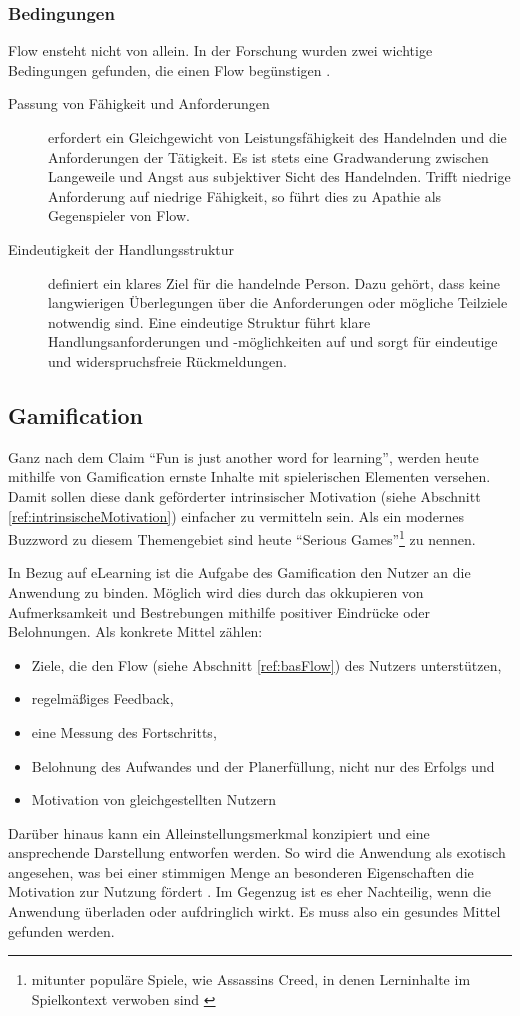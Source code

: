 \subsubsection{Bedingungen}
Flow ensteht nicht von allein. In der Forschung wurden zwei wichtige Bedingungen
gefunden, die einen Flow begünstigen \cite{csikszentmihalyi:1993}.
\begin{description}
\item[Passung von Fähigkeit und Anforderungen] erfordert ein Gleichgewicht von
Leistungsfähigkeit des Handelnden und die Anforderungen der Tätigkeit. Es ist
stets eine Gradwanderung zwischen Langeweile und Angst aus subjektiver Sicht
des Handelnden. Trifft niedrige Anforderung auf niedrige Fähigkeit, so führt
dies zu Apathie als Gegenspieler von Flow.
\item[Eindeutigkeit der Handlungsstruktur] definiert ein klares Ziel für die
handelnde Person. Dazu gehört, dass keine langwierigen Überlegungen über die
Anforderungen oder mögliche Teilziele notwendig sind. Eine eindeutige Struktur
führt klare Handlungsanforderungen und -möglichkeiten auf und sorgt für
eindeutige und widerspruchsfreie Rückmeldungen. 
\end{description}


\subsection{Gamification}\label{ref:gamification}
Ganz nach dem Claim "`Fun is just another word for learning"'\cite{koster:2005},
werden heute mithilfe von Gamification ernste Inhalte mit spielerischen
Elementen versehen. Damit sollen diese dank geförderter intrinsischer
Motivation (siehe Abschnitt \ref{ref:intrinsischeMotivation}) einfacher zu
vermitteln sein. Als ein modernes Buzzword zu diesem Themengebiet sind heute
"`Serious Games"'\footnote{mitunter populäre Spiele, wie Assassins Creed, in
denen Lerninhalte im Spielkontext verwoben sind \cite{breitlauch:2013}} zu
nennen.

In Bezug auf eLearning ist die Aufgabe des Gamification den Nutzer an die
Anwendung zu binden. Möglich wird dies durch das okkupieren von Aufmerksamkeit
und Bestrebungen mithilfe positiver Eindrücke oder Belohnungen. Als konkrete
Mittel zählen:
\begin{itemize}
  \item Ziele, die den Flow (siehe Abschnitt \ref{ref:basFlow}) des
Nutzers unterstützen,
	\item regelmäßiges Feedback,
	\item eine Messung des Fortschritts,
	\item Belohnung des Aufwandes und der Planerfüllung, nicht nur des Erfolgs und
	\item Motivation von gleichgestellten Nutzern
\end{itemize}
Darüber hinaus kann ein Alleinstellungsmerkmal konzipiert und eine ansprechende
Darstellung entworfen werden. So wird die Anwendung als exotisch angesehen, was
bei einer stimmigen Menge an besonderen Eigenschaften die Motivation zur Nutzung
fördert \cite{raymer:2011}. Im Gegenzug ist es eher Nachteilig, wenn die
Anwendung überladen oder aufdringlich wirkt. Es muss also ein gesundes Mittel
gefunden werden.

